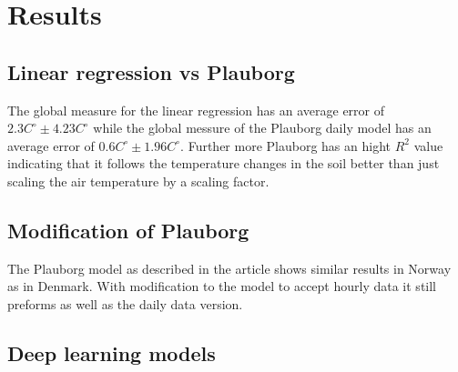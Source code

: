 \section{Results}


\subsection{Linear regression vs Plauborg}

The global measure for the linear regression has an average error of $2.3C^\circ \pm 4.23 C^\circ$ while the global messure of the Plauborg daily model has an average error of $0.6C^\circ \pm 1.96 C^\circ$. Further more Plauborg has an hight $R^2$ value indicating that it follows the temperature changes in the soil better than just scaling the air temperature by a scaling factor.

\subsection{Modification of Plauborg}

The Plauborg model as described in the article\cite{plauborg_simple_2002} shows similar results in Norway as in Denmark. With modification to the model to accept hourly data it still preforms as well as the daily data version.  

\subsection{Deep learning models}
